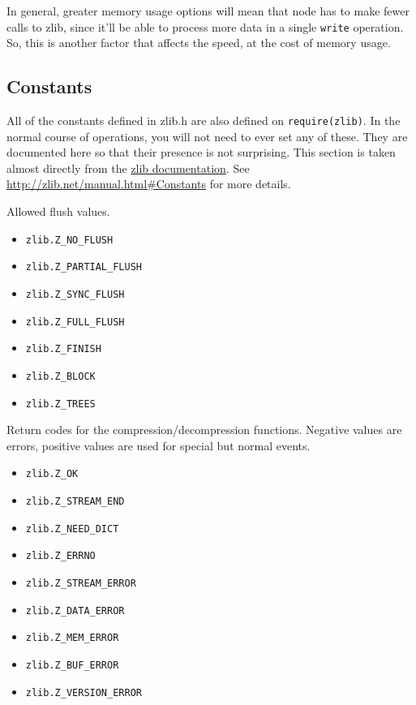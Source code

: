 In general, greater memory usage options will mean that node has to make
fewer calls to zlib, since it'll be able to process more data in a
single \texttt{write} operation. So, this is another factor that affects
the speed, at the cost of memory usage.

\subsection{Constants}\label{constants}

All of the constants defined in zlib.h are also defined on
\texttt{require(\textquotesingle{}zlib\textquotesingle{})}. In the
normal course of operations, you will not need to ever set any of these.
They are documented here so that their presence is not surprising. This
section is taken almost directly from the
\href{http://zlib.net/manual.html\#Constants}{zlib documentation}. See
\url{http://zlib.net/manual.html\#Constants} for more details.

Allowed flush values.

\begin{itemize}
\itemsep1pt\parskip0pt
\item
  \texttt{zlib.Z\_NO\_FLUSH}
\item
  \texttt{zlib.Z\_PARTIAL\_FLUSH}
\item
  \texttt{zlib.Z\_SYNC\_FLUSH}
\item
  \texttt{zlib.Z\_FULL\_FLUSH}
\item
  \texttt{zlib.Z\_FINISH}
\item
  \texttt{zlib.Z\_BLOCK}
\item
  \texttt{zlib.Z\_TREES}
\end{itemize}

Return codes for the compression/decompression functions. Negative
values are errors, positive values are used for special but normal
events.

\begin{itemize}
\itemsep1pt\parskip0pt
\item
  \texttt{zlib.Z\_OK}
\item
  \texttt{zlib.Z\_STREAM\_END}
\item
  \texttt{zlib.Z\_NEED\_DICT}
\item
  \texttt{zlib.Z\_ERRNO}
\item
  \texttt{zlib.Z\_STREAM\_ERROR}
\item
  \texttt{zlib.Z\_DATA\_ERROR}
\item
  \texttt{zlib.Z\_MEM\_ERROR}
\item
  \texttt{zlib.Z\_BUF\_ERROR}
\item
  \texttt{zlib.Z\_VERSION\_ERROR}
\end{itemize}

